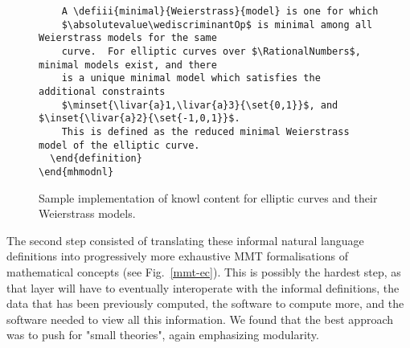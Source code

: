 \begin{figure}
\begin{verbatim}
    A \defiii{minimal}{Weierstrass}{model} is one for which
    $\absolutevalue\wediscriminantOp$ is minimal among all Weierstrass models for the same
    curve.  For elliptic curves over $\RationalNumbers$, minimal models exist, and there
    is a unique minimal model which satisfies the additional constraints
    $\minset{\livar{a}1,\livar{a}3}{\set{0,1}}$, and $\inset{\livar{a}2}{\set{-1,0,1}}$. 
    This is defined as the reduced minimal Weierstrass model of the elliptic curve.
  \end{definition}
\end{mhmodnl}
\end{verbatim}
\begin{caption} Sample \stex implementation of \LMFDB knowl content for elliptic curves and their Weierstrass models.
\label{stex-ec}
\end{caption}
\end{figure}

The second step consisted of translating these informal natural language definitions into progressively more exhaustive MMT formalisations of mathematical concepts (see Fig.~\ref{mmt-ec}). This is possibly the hardest step, as that layer will have to eventually interoperate with the informal \stex definitions, the data that has been previously computed, the software to compute more, and the software needed to view all this information. We found that the best approach was to push for "small theories", again emphasizing modularity. 







